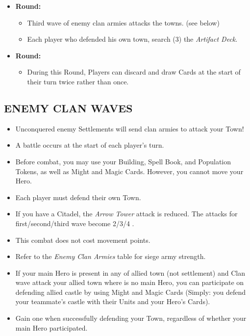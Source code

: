 \begin{multicols}{2}
\begin{itemize}
   \item \textbf{ Round:}
    \begin{itemize}
      \item Third wave of enemy clan armies attacks the towns. (see below)
      \item Each player who defended his own town, search (3) the \textit{Artifact Deck}.
    \end{itemize}
   \item \textbf{ Round:}
    \begin{itemize}
      \item During this Round, Players can discard and draw Cards at the start of their turn twice rather than once.
    \end{itemize}
  \end{itemize}

\subsection*{\MakeUppercase{Enemy clan waves}}
\begin{itemize}
  \item Unconquered enemy Settlements will send clan armies to attack your Town!
  \item A battle occurs at the start of each player's turn.
  \item Before combat, you may use your Building, Spell Book, and Population Tokens, as well as Might and Magic Cards. However, you cannot move your Hero.
  \item Each player must defend their own Town.
  \item If you have a Citadel, the \textit{Arrow Tower} attack is reduced. The attacks for first/second/third wave become 2/3/4 .
  \item This combat does not cost movement points.
  \item Refer to the \textit{Enemy Clan Armies} table for siege army strength.
  \item If your main Hero is present in any of allied town (not settlement) and Clan wave attack your allied town where is no main Hero, you can participate on defending allied castle by using Might and Magic Cards (Simply: you defend your teammate's castle with their Units and your Hero's Cards).
  \item Gain one  when successfully defending your Town, regardless of whether your main Hero participated.
\end{itemize}


\end{multicols}
